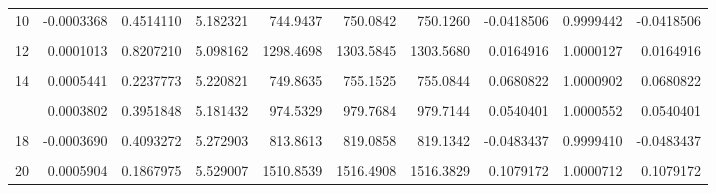 \documentclass[a4paper]{tufte-handout}
\begin{document}
\begin{table}
{\begin{tabular}[t]{rrrrrrrrrr}
10 & -0.0003368 & 0.4514110 & 5.182321 & 744.9437 & 750.0842 & 750.1260 & -0.0418506 & 0.9999442 & -0.0418506\\
\addlinespace
\cellcolor{gray!6}{11} & \cellcolor{gray!6}{0.0001890} & \cellcolor{gray!6}{0.6725413} & \cellcolor{gray!6}{5.312891} & \cellcolor{gray!6}{748.5687} & \cellcolor{gray!6}{753.9055} & \cellcolor{gray!6}{753.8816} & \cellcolor{gray!6}{0.0238408} & \cellcolor{gray!6}{1.0000316} & \cellcolor{gray!6}{0.0238408}\\
12 & 0.0001013 & 0.8207210 & 5.098162 & 1298.4698 & 1303.5845 & 1303.5680 & 0.0164916 & 1.0000127 & 0.0164916\\
\cellcolor{gray!6}{13} & \cellcolor{gray!6}{0.0002387} & \cellcolor{gray!6}{0.5935867} & \cellcolor{gray!6}{5.178266} & \cellcolor{gray!6}{1903.9322} & \cellcolor{gray!6}{1909.1579} & \cellcolor{gray!6}{1909.1105} & \cellcolor{gray!6}{0.0473932} & \cellcolor{gray!6}{1.0000248} & \cellcolor{gray!6}{0.0473932}\\
14 & 0.0005441 & 0.2237773 & 5.220821 & 749.8635 & 755.1525 & 755.0844 & 0.0680822 & 1.0000902 & 0.0680822\\
\cellcolor{gray!6}{15} & \cellcolor{gray!6}{0.0002153} & \cellcolor{gray!6}{0.6302591} & \cellcolor{gray!6}{5.207314} & \cellcolor{gray!6}{1537.7464} & \cellcolor{gray!6}{1542.9922} & \cellcolor{gray!6}{1542.9537} & \cellcolor{gray!6}{0.0385271} & \cellcolor{gray!6}{1.0000250} & \cellcolor{gray!6}{0.0385271}\\
\addlinespace
16 & 0.0003802 & 0.3951848 & 5.181432 & 974.5329 & 979.7684 & 979.7144 & 0.0540401 & 1.0000552 & 0.0540401\\
\cellcolor{gray!6}{17} & \cellcolor{gray!6}{0.0003537} & \cellcolor{gray!6}{0.4289961} & \cellcolor{gray!6}{5.123908} & \cellcolor{gray!6}{648.6608} & \cellcolor{gray!6}{653.8255} & \cellcolor{gray!6}{653.7847} & \cellcolor{gray!6}{0.0407833} & \cellcolor{gray!6}{1.0000624} & \cellcolor{gray!6}{0.0407833}\\
18 & -0.0003690 & 0.4093272 & 5.272903 & 813.8613 & 819.0858 & 819.1342 & -0.0483437 & 0.9999410 & -0.0483437\\
\cellcolor{gray!6}{19} & \cellcolor{gray!6}{0.0002439} & \cellcolor{gray!6}{0.5854696} & \cellcolor{gray!6}{5.635600} & \cellcolor{gray!6}{933.4921} & \cellcolor{gray!6}{939.1631} & \cellcolor{gray!6}{939.1277} & \cellcolor{gray!6}{0.0353831} & \cellcolor{gray!6}{1.0000377} & \cellcolor{gray!6}{0.0353831}\\
20 & 0.0005904 & 0.1867975 & 5.529007 & 1510.8539 & 1516.4908 & 1516.3829 & 0.1079172 & 1.0000712 & 0.1079172\\
\bottomrule
\end{tabular}}
\end{table}
\end{document}
